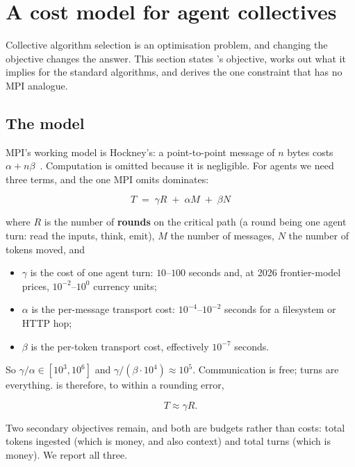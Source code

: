 \section{A cost model for agent collectives}
\label{sec:cost}

Collective algorithm selection is an optimisation problem, and changing the
objective changes the answer. This section states \ampi{}'s objective, works
out what it implies for the standard algorithms, and derives the one
constraint that has no MPI analogue.

\subsection{The model}

MPI's working model is Hockney's: a point-to-point message of $n$ bytes
costs $\alpha + n\beta$~\cite{Hockney1994}. Computation is
omitted because it is negligible. For agents we need three terms, and the
one MPI omits dominates:

\begin{equation}
T \;=\; \gamma R \;+\; \alpha M \;+\; \beta N
\label{eq:cost}
\end{equation}

where $R$ is the number of \textbf{rounds} on the critical path (a round
being one agent turn: read the inputs, think, emit), $M$ the number of
messages, $N$ the number of tokens moved, and

\begin{itemize}
\item $\gamma$ is the cost of one agent turn: $10$--$100$ seconds and, at
2026 frontier-model prices, $10^{-2}$--$10^{0}$ currency units;
\item $\alpha$ is the per-message transport cost: $10^{-4}$--$10^{-2}$
seconds for a filesystem or HTTP hop;
\item $\beta$ is the per-token transport cost, effectively $10^{-7}$
seconds.
\end{itemize}

So $\gamma/\alpha \in [10^3, 10^6]$ and $\gamma/(\beta \cdot 10^4) \approx
10^5$. Communication is free; turns are everything.  is
therefore, to within a rounding error,

\begin{equation}
T \approx \gamma R.
\label{eq:cost-simple}
\end{equation}

Two secondary objectives remain, and both are budgets rather than costs:
total tokens ingested (which is money, and also context) and total turns
(which is money). We report all three.

